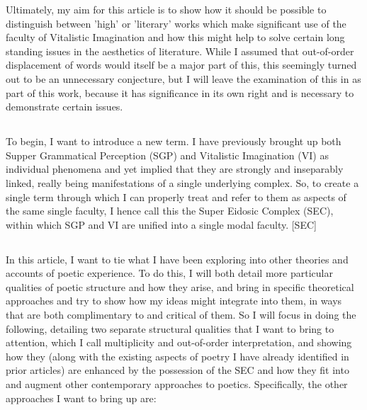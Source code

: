 \documentclass[]{article}
\begin{document}
Ultimately, my aim for this article is to show how it should be possible to distinguish between 'high' or 'literary' works which make significant use of the faculty of Vitalistic Imagination and how this might help to solve certain long standing issues in the aesthetics of literature. While I assumed that out-of-order displacement of words would itself be a major part of this, this seemingly turned out to be an unnecessary conjecture, but I will leave the examination of this in as part of this work, because it has significance in its own right and is necessary to demonstrate certain issues.\\



\subsection{}



To begin, I want to introduce a new term. I have previously brought up both Supper Grammatical Perception (SGP) and Vitalistic Imagination (VI) as individual phenomena and yet implied that they are strongly and inseparably linked, really being manifestations of a single underlying complex. So, to create a single term through which I can properly treat and refer to them as aspects of the same single faculty, I hence call this the Super Eidosic Complex (SEC), within which SGP and VI are unified into a single modal faculty. [SEC]



\subsection{}



In this article, I want to tie what I have been exploring into other theories and accounts of poetic experience. To do this, I will both detail more particular qualities of poetic structure and how they arise, and bring in specific theoretical approaches and try to show how my ideas might integrate into them, in ways that are both complimentary to and critical of them. So I will focus in doing the following, detailing two separate structural qualities that I want to bring to attention, which I call multiplicity and out-of-order interpretation, and showing how they (along with the existing aspects of poetry I have already identified in prior articles) are enhanced by the possession of the SEC and how they fit into and augment other contemporary approaches to poetics. Specifically, the other approaches I want to bring up are:
\end{document}
